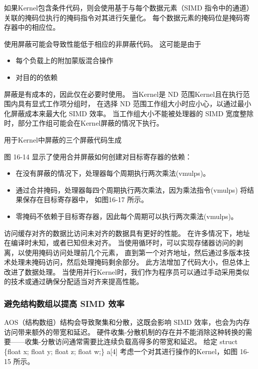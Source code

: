 如果Kernel包含条件代码，则会使用基于与每个数据元素（SIMD 指令中的通道）关联的掩码位执行的掩码指令对其进行矢量化。 
每个数据元素的掩码位是掩码寄存器中的相应位。

使用屏蔽可能会导致性能低于相应的非屏蔽代码。 这可能是由于

\begin{itemize}
	\item 每个负载上的附加蒙版混合操作

	\item 对目的的依赖
\end{itemize}

屏蔽是有成本的，因此仅在必要时使用。 当Kernel是 ND 范围Kernel且在执行范围内具有显式工作项分组时，
在选择 ND 范围工作组大小时应小心，以通过最小化屏蔽成本来最大化 SIMD 效率。 
当工作组大小不能被处理器的 SIMD 宽度整除时，部分工作组可能会在Kernel屏蔽的情况下执行。

{\color{red} 用于Kernel中屏蔽的三个屏蔽代码生成}

图 16-14 显示了使用合并屏蔽如何创建对目标寄存器的依赖：

\begin{itemize}
	\item 在没有屏蔽的情况下，处理器每个周期执行两次乘法(vmulps)。

	\item 通过合并掩码，处理器每四个周期执行两次乘法，因为乘法指令(vmulps) 将结果保存在目标寄存器中，
	如图16-17 所示。

	\item 零掩码不依赖于目标寄存器，因此每个周期可以执行两次乘法(vmulps)。
\end{itemize}

访问缓存对齐的数据比访问未对齐的数据具有更好的性能。 在许多情况下，地址在编译时未知，或者已知但未对齐。 
当使用循环时，可以实现存储器访问的剥离，以使用掩码访问处理前几个元素，
直到第一个对齐地址，然后通过多版本技术处理未掩码访问，然后处理掩码剩余部分。 
此方法增加了代码大小，但总体上改进了数据处理。 
当使用并行Kernel时，我们作为程序员可以通过手动采用类似的技术或通过确保分配适当对齐来提高性能。

\subsubsection{避免结构数组以提高 SIMD 效率}
AOS（结构数组）结构会导致聚集和分散，这既会影响 SIMD 效率，也会为内存访问带来额外的带宽和延迟。 
硬件收集-分散机制的存在并不能消除这种转换的需要——收集-分散访问通常需要比连续负载高得多的带宽和延迟。 
给定 struct \{float x; float y; float z; float w;\} a[4]
考虑一个对其进行操作的Kernel，如图 16-15 所示。

